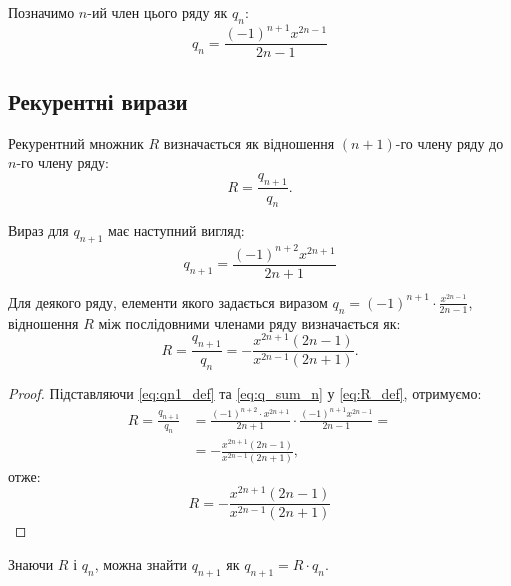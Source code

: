 	\begin{definition}
		Позначимо \( n \)-ий член цього ряду як \( q_n \):
	\begin{equation} \label{eq:q_sum_n}
	q_n = \frac{(-1)^{n+1} x^{2n-1}}{2n-1}
	\end{equation}
	\end{definition}
	
	\subsection{Рекурентні вирази}
	
	\begin{definition}
		Рекурентний множник \( R \) визначається як відношення \( (n+1) \)-го члену ряду до \( n \)-го члену ряду:
		\begin{equation} \label{eq:R_def}
			R = \frac{q_{n+1}}{q_n}.
		\end{equation}
	\end{definition}
	
	\begin{definition}
		Вираз для \( q_{n+1} \) має наступний вигляд:
		\begin{equation} \label{eq:qn1_def}
			q_{n+1} = \frac{(-1)^{n+2} x^{2n+1}}{2n+1}
		\end{equation}
	\end{definition}
	
	\begin{theorem} \label{thm:ratio_test_result}
		Для деякого ряду, елементи якого задається виразом \(q_n = (-1)^{n+1} \cdot \frac{x^{2n-1}}{2n-1}\), відношення \(R\) між послідовними членами ряду визначається як:
		\[
		R = \frac{q_{n+1}}{q_n} = -\frac{x^{2n+1} (2n-1)}{x^{2n-1} (2n+1)}.
		\]
	\end{theorem}
	
	\begin{proof}
		Підставляючи \eqref{eq:qn1_def} та \eqref{eq:q_sum_n} у \eqref{eq:R_def}, отримуємо:
		\begin{align*}
			R = \frac{q_{n+1}}{q_n} &= 
			\frac{(-1)^{n+2} \cdot x^{2n+1}}{2n+1} \cdot \frac{(-1)^{n+1} x^{2n-1}}{2n-1}= \\
			&= -\frac{x^{2n+1} (2n-1)}{x^{2n-1} (2n+1)},
		\end{align*}
		отже:
	\begin{equation} \label{eq:R_simplified}
	R = -\frac{x^{2n+1} (2n-1)}{x^{2n-1} (2n+1)}
\end{equation}
	\end{proof}
	
	\begin{corollary}
		Знаючи \( R \) і \( q_n \), можна знайти \( q_{n+1} \) як \( q_{n+1} = R \cdot q_n \).
	\end{corollary}
	
	
	
	



	
	
	
